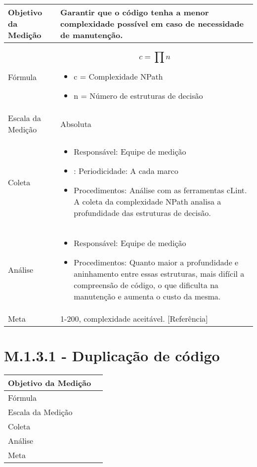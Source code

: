 	\begin{tabular}{ |p{5cm}|p{5cm}|  }
	 \hline
	 Objetivo da Medição 		& 	  Garantir que o código tenha a menor complexidade possível em caso de necessidade de manutenção. \\
	 \hline
	 Fórmula		& 		\[ c = \prod{n} \] \begin{itemize} \item c = Complexidade NPath 
	 \item n = Número de estruturas de decisão \end{itemize}\\
	 \hline
	 Escala da Medição 		& 		Absoluta \\
	 \hline
	 Coleta		& 		\begin{itemize} \item Responsável: Equipe de medição \item: Periodicidade: A cada marco \item Procedimentos: Análise com as ferramentas cLint. A coleta da complexidade NPath analisa a profundidade das estruturas de decisão. \end{itemize} \\
	 \hline
	 Análise		& 		\begin{itemize} \item Responsável: Equipe de medição \item Procedimentos: Quanto maior a profundidade e aninhamento entre essas estruturas, mais difícil a compreensão de código, o que dificulta na manutenção e aumenta o custo da mesma. \end{itemize} \\
	 \hline
	 Meta		& 	1-200, complexidade aceitável. [Referência]	 \\
	 \hline
	\end{tabular}


\section{M.1.3.1 - Duplicação de código} 

	\begin{tabular}{ |p{5cm}|p{5cm}|  }
	 \hline
	 Objetivo da Medição 		& 	   \\
	 \hline
	 Fórmula		& 		\\
	 \hline
	 Escala da Medição 		& 		 \\
	 \hline
	 Coleta		& 		\\
	 \hline
	 Análise		& 		 \\
	 \hline
	 Meta		& 		 \\
	 \hline
	\end{tabular}


